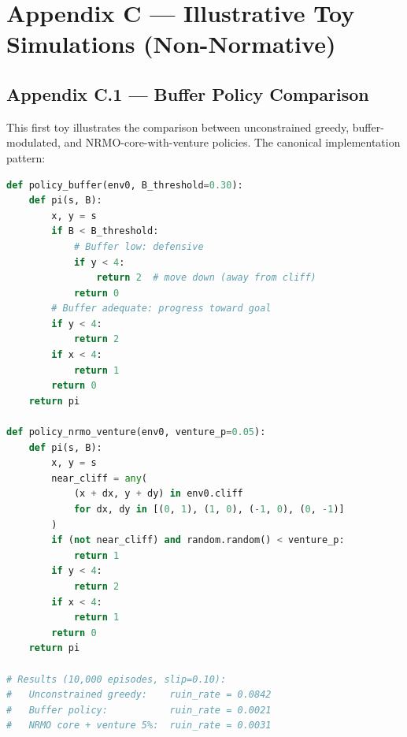 
\chapter{Appendix C --- Illustrative Toy Simulations
(Non-Normative)}
\label{ch:appendix-c-toys}


\section{Appendix C.1 --- Buffer Policy Comparison}
\label{sec:appendix-c-1}

This first toy illustrates the comparison between unconstrained
greedy, buffer-modulated, and NRMO-core-with-venture policies. The
canonical implementation pattern:

\begin{lstlisting}[language=Python,basicstyle=\ttfamily\scriptsize,
                   frame=single]
def policy_buffer(env0, B_threshold=0.30):
    def pi(s, B):
        x, y = s
        if B < B_threshold:
            # Buffer low: defensive
            if y < 4:
                return 2  # move down (away from cliff)
            return 0
        # Buffer adequate: progress toward goal
        if y < 4:
            return 2
        if x < 4:
            return 1
        return 0
    return pi

def policy_nrmo_venture(env0, venture_p=0.05):
    def pi(s, B):
        x, y = s
        near_cliff = any(
            (x + dx, y + dy) in env0.cliff
            for dx, dy in [(0, 1), (1, 0), (-1, 0), (0, -1)]
        )
        if (not near_cliff) and random.random() < venture_p:
            return 1
        if y < 4:
            return 2
        if x < 4:
            return 1
        return 0
    return pi

# Results (10,000 episodes, slip=0.10):
#   Unconstrained greedy:    ruin_rate = 0.0842
#   Buffer policy:           ruin_rate = 0.0021
#   NRMO core + venture 5%:  ruin_rate = 0.0031
\end{lstlisting}


